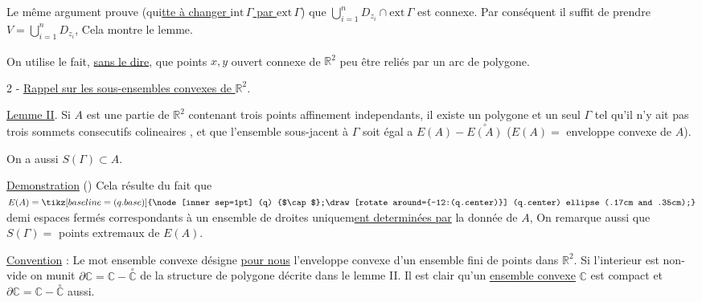 \margin{!\ $\cdot$} Le même argument prouve (qui\uline{tte à changer $\mathrm{int}\,\Gamma$ par $\mathrm{ext}\,\Gamma$}) que $\bigcup\limits_{i=1}^{n}D_{z_{i}}\cap\mathrm{ext}\,\Gamma$ est connexe. Par conséquent il suffit de prendre $V=\bigcup\limits_{i=1}^{n}D_{z_{i}}$, Cela montre le lemme.

On\textsuperscript{\unsure{$*$}} utilise le fait, \uline{sans le dire}, que   points $x,y$   ouvert connexe de $\mathbb{R}^{2}$ peu être reliés par un arc de polygone.


2 - \uline{Rappel sur les sous-ensembles convexes de $\mathbb{R}^{2}$}.

\margin{!}\uline{Lemme II}. Si $A$ est une partie  de $\mathbb{R}^{2}$ contenant trois points affinement independants, il existe un polygone et un seul $\Gamma$ tel qu'il n'y ait pas trois sommets consecutifs colineaires , et  que l'ensemble sous-jacent à $\Gamma$ soit égal a $E(A)-\overset{\circ}{E(A)}$ ($E(A)=$ enveloppe convexe de $A$).

On a aussi $S(\Gamma)\subset A$.

%
\uline{Demonstration} () Cela résulte du fait que $E(A)=\tikz[baseline=(q.base)]{\node[inner sep=1pt] (q) {$\cap$};\draw[rotate around={-12:(q.center)}] (q.center) ellipse (.17cm and .35cm);}$ demi espaces fermés correspondants à un ensemble de droites uniquem\uline{ent determinées par} la donnée de $A$, On remarque aussi que $S(\Gamma)=$  points extremaux de $E(A)$.

%
\uline{Convention} : Le mot ensemble convexe désigne \uline{pour nous} l'enveloppe convexe d'un ensemble fini de points dans $\mathbb{R}^{2}$.  Si l'interieur est non-vide on munit $\partial\mathbb{C}=\mathbb{C}-\overset{\circ}{\mathbb{C}}$ de la structure de polygone décrite dans le lemme II. Il est clair qu'un \uline{ensemble convexe} $\mathbb{C}$ est compact et  $\partial\mathbb{C}=\mathbb{C}-\overset{\circ}{\mathbb{C}}$ aussi.


